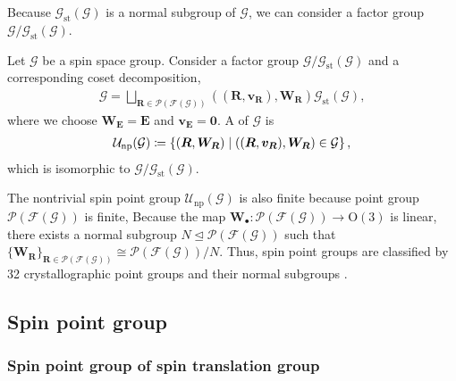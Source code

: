 Because $\mathcal{G}_{\mathrm{st}}(\mathcal{G})$ is a normal subgroup of $\mathcal{G}$, we can consider a factor group $\mathcal{G} / \mathcal{G}_{\mathrm{st}}(\mathcal{G})$.
\begin{screen}
  \begin{definition}
    Let $\mathcal{G}$ be a spin space group.
    Consider a factor group $\mathcal{G} / \mathcal{G}_{\mathrm{st}}(\mathcal{G})$ and a corresponding coset decomposition,
    \begin{align}
      \mathcal{G}
        = \bigsqcup_{ \bm{R} \in \mathcal{P}(\mathcal{F}(\mathcal{G})) } ((\bm{R}, \bm{v}_{\bm{R}}), \bm{W}_{\bm{R}}) \mathcal{G}_{\mathrm{st}}(\mathcal{G}),
    \end{align}
    where we choose $\bm{W}_{\bm{E}} = \bm{E}$ and $\bm{v}_{\bm{E}} = \bm{0}$.
    A  of $\mathcal{G}$ is
    \begin{align}
      \mathcal{U}_{\mathrm{np}}(\mathcal{G})
      \coloneqq
      \left\{  (\bm{R}, \bm{W}_{\bm{R}})  \mathrel{}\middle|\mathrel{}  ((\bm{R}, \bm{v}_{\bm{R}}), \bm{W}_{\bm{R}}) \in \mathcal{G}  \right\},
    \end{align}
    which is isomorphic to $\mathcal{G} / \mathcal{G}_{\mathrm{st}}(\mathcal{G})$.
  \end{definition}
\end{screen}

The nontrivial spin point group $\mathcal{U}_{\mathrm{np}}(\mathcal{G})$ is also finite because point group $\mathcal{P}(\mathcal{F}(\mathcal{G}))$ is finite,
Because the map $\bm{W}_{\bullet}: \mathcal{P}(\mathcal{F}(\mathcal{G})) \to \mathrm{O}(3)$ is linear, there exists a normal subgroup $N \trianglelefteq \mathcal{P}(\mathcal{F}(\mathcal{G}))$ such that $\{ \bm{W}_{\bm{R}} \}_{ \bm{R} \in \mathcal{P}(\mathcal{F}(\mathcal{G})) } \cong \mathcal{P}(\mathcal{F}(\mathcal{G})) / N$.
Thus, spin point groups are classified by 32 crystallographic point groups and their normal subgroups \cite{Litvin:a14103}.

\subsection{Spin point group}


\subsubsection{Spin point group of spin translation group}

